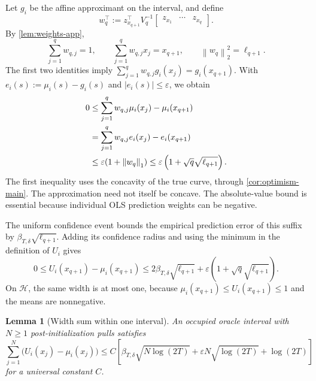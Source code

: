\documentclass[11pt]{article}
\newtheorem{lemma}[lemma]{Lemma}
\theoremstyle{remark}
\newcommand{\norm}[1]{\left\lVert #1\right\rVert}
\begin{document}
Let $g_i$ be the affine approximant on the interval, and define
\[
w_q^\top
:=z_{x_{q+1}}^\top V_q^{-1}
\begin{bmatrix}z_{x_1}&\cdots&z_{x_q}\end{bmatrix}.
\]
By \cref{lem:weights-app},
\begin{equation}\label{eq:weights-oracle-app}
\sum_{j=1}^qw_{q,j}=1,
\qquad
\sum_{j=1}^qw_{q,j}x_j=x_{q+1},
\qquad
\norm{w_q}_2^2=\ell_{q+1}.
\end{equation}
The first two identities imply
$\sum_{j=1}^q w_{q,j}g_i(x_j)=g_i(x_{q+1})$. With
$e_i(s):=\mu_i(s)-g_i(s)$ and $|e_i(s)|\le\varepsilon$, we obtain
\begin{align}
0
&\le\sum_{j=1}^qw_{q,j}\mu_i(x_j)-\mu_i(x_{q+1})
\label{eq:misspec-positive-app}\\
&=\sum_{j=1}^qw_{q,j}e_i(x_j)-e_i(x_{q+1})\notag\\
&\le\varepsilon(1+\norm{w_q}_1)
\le\varepsilon\left(1+\sqrt q\sqrt{\ell_{q+1}}\right).
\label{eq:misspec-app}
\end{align}
The first inequality uses the concavity of the true curve, through
\cref{cor:optimism-main}. The approximation need not itself be concave. The
absolute-value bound is essential because individual OLS prediction weights
can be negative.

The uniform confidence event bounds the empirical prediction error of this
suffix by $\beta_{T,\delta}\sqrt{\ell_{q+1}}$. Adding its confidence radius
and using the minimum in the definition of $U_i$ gives
\begin{equation}\label{eq:single-pull-width-app}
0\le U_i(x_{q+1})-\mu_i(x_{q+1})
\le2\beta_{T,\delta}\sqrt{\ell_{q+1}}
+\varepsilon\left(1+\sqrt q\sqrt{\ell_{q+1}}\right).
\end{equation}
On $\mathcal H$, the same width is at most one, because
$\mu_i(x_{q+1})\le U_i(x_{q+1})\le1$ and the means are nonnegative.

\begin{samepage}
\begin{lemma}[Width sum within one interval]\label{lem:one-segment-app}
An occupied oracle interval with $N\ge1$ post-initialization pulls satisfies
\begin{equation}\label{eq:one-segment-app}
\sum_{j=1}^N\bigl(U_i(x_j)-\mu_i(x_j)\bigr)
\le C\left[
\beta_{T,\delta}\sqrt{N\log(2T)}
+\varepsilon N\sqrt{\log(2T)}
+\log(2T)
\right]
\end{equation}
for a universal constant $C$.
\end{lemma}
\end{samepage}
\end{document}
